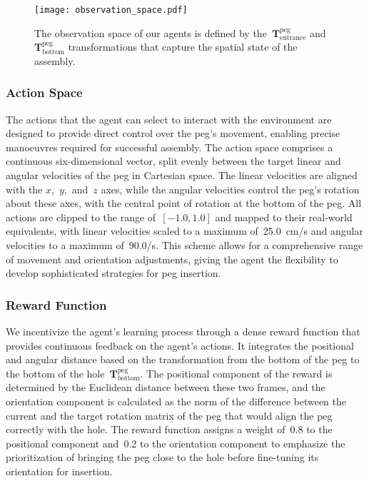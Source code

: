 \begin{figure}[ht]
    \centering
    \texttt{[image: observation\_space.pdf]}
    \caption{The observation space of our agents is defined by the~\(\mathbf{T}_{\text{entrance}}^{\text{peg}}\) and~\(\mathbf{T}_{\text{bottom}}^{\text{peg}}\) transformations that capture the spatial state of the assembly.}
    \label{fig:observation-space}
\end{figure}


\subsubsection*{Action Space}\label{sssec:action-space}

The actions that the agent can select to interact with the environment are designed to provide direct control over the peg's movement, enabling precise manoeuvres required for successful assembly. The action space comprises a continuous six-dimensional vector, split evenly between the target linear and angular velocities of the peg in Cartesian space. The linear velocities are aligned with the \(x\),~\(y\),~and~\(z\) axes, while the angular velocities control the peg's rotation about these axes, with the central point of rotation at the bottom of the peg. All actions are clipped to the range of~\([-1.0, 1.0]\) and mapped to their real-world equivalents, with linear velocities scaled to a maximum of~25.0~cm/s and angular velocities to a maximum of~90.0\textdegree/s. This scheme allows for a comprehensive range of movement and orientation adjustments, giving the agent the flexibility to develop sophisticated strategies for peg insertion.


\subsubsection*{Reward Function}\label{sssec:reward-function}

We incentivize the agent's learning process through a dense reward function that provides continuous feedback on the agent's actions. It integrates the positional and angular distance based on the transformation from the bottom of the peg to the bottom of the hole~\(\mathbf{T}_{\text{bottom}}^{\text{peg}}\). The positional component of the reward is determined by the Euclidean distance between these two frames, and the orientation component is calculated as the norm of the difference between the current and the target rotation matrix of the peg that would align the peg correctly with the hole. The reward function assigns a weight of~0.8 to the positional component and~0.2 to the orientation component to emphasize the prioritization of bringing the peg close to the hole before fine-tuning its orientation for insertion.

